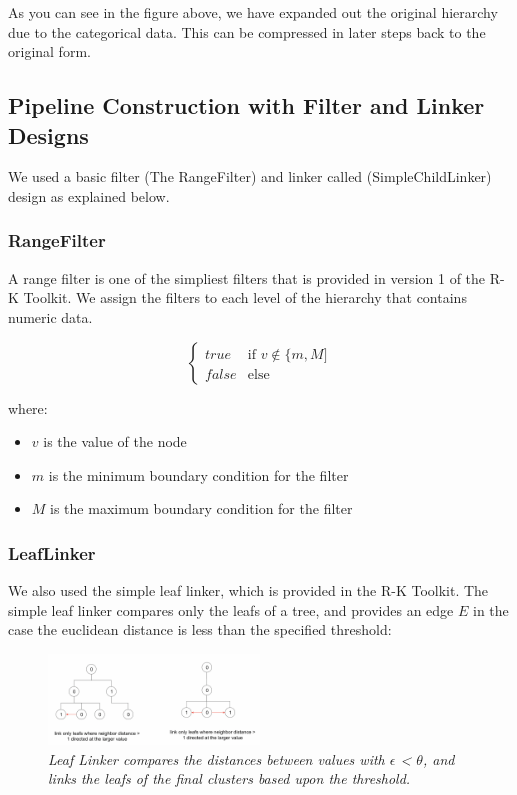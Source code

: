 As you can see in the figure above, we have expanded out the original hierarchy due to the categorical data. This can be compressed in later steps back to the original form.

\subsection{Pipeline Construction with Filter and Linker Designs}

We used a basic filter (The RangeFilter) and linker called (SimpleChildLinker) design as explained below.

\subsubsection{RangeFilter}

A range filter is one of the simpliest filters that is provided in version 1 of the R-K Toolkit. We assign the filters to each level of the hierarchy that contains numeric data.

\[
\begin{cases}
   true  & \text{if } v \notin \lbrace m, M \rbrack\\
   false & \text{else}
\end{cases}
\]

where:

\begin{itemize}
        \item{$v$ is the value of the node}
        \item{$m$ is the minimum boundary condition for the filter}
        \item{$M$ is the maximum boundary condition for the filter}
\end{itemize}

\subsubsection{LeafLinker}

We also used the simple leaf linker, which is provided in the R-K Toolkit. The simple leaf linker compares only the leafs of a tree, and provides an edge $E$ in the case the euclidean distance is less than the specified threshold:

\begin{figure}[H]
	\centering
        \includegraphics[width=0.5\textwidth]{images/linkage.png}
	\caption{\textit{Leaf Linker compares the distances between values with $\epsilon$ < $\theta$, and links the leafs of the final clusters based upon the threshold.}}
	\label{fig:linker}
\end{figure}

